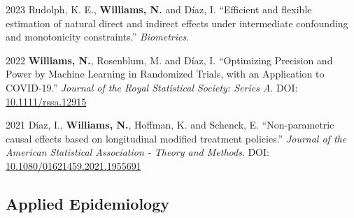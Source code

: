 \documentclass[12pt,letterpaper]{report}
\begin{document}
\begin{tablist}
    \item[2023] \tab Rudolph, K. E., \textbf{Williams, N.} and Díaz, I. \enquote{Efficient and flexible estimation of natural direct and indirect effects under intermediate confounding and monotonicity constraints.} \textit{Biometrics}.
    
        \item[2022] \tab \textbf{Williams, N.}, Rosenblum, M. and Díaz, I. \enquote {Optimizing Precision and Power by Machine Learning in Randomized Trials, with an Application to COVID-19.} \textit{Journal of the Royal Statistical Society: Series A}. DOI: \href{https://doi.org/10.1111/rssa.12915}{10.1111/rssa.12915}
    
       \item[2021] \tab Díaz, I., \textbf{Williams, N.}, Hoffman, K. and Schenck, E. \enquote{Non-parametric causal effects based on longitudinal modified treatment policies.} \textit{Journal of the American Statistical Association - Theory and Methods}. DOI: \href{https://doi.org/10.1080/01621459.2021.1955691}{10.1080/01621459.2021.1955691}
       
    \end{tablist}

    \subsection*{Applied Epidemiology}
\end{document}
